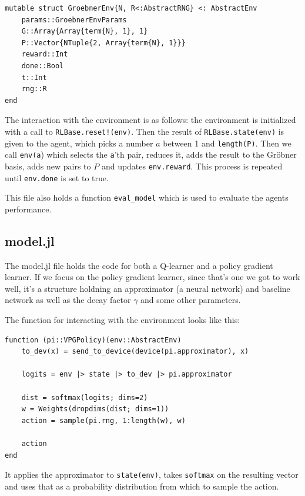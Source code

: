 \documentclass{article}
\theoremstyle{changedot}
\theoremstyle{changedotbreak}
\theoremstyle{nonumberplain}
\begin{document}
\begin{verbatim}
mutable struct GroebnerEnv{N, R<:AbstractRNG} <: AbstractEnv
    params::GroebnerEnvParams
    G::Array{Array{term{N}, 1}, 1}
    P::Vector{NTuple{2, Array{term{N}, 1}}}
    reward::Int
    done::Bool
    t::Int
    rng::R
end
\end{verbatim}

The interaction with the environment is as follows: the environment is initialized with a call to \texttt{RLBase.reset!(env)}. Then the result of \texttt{RLBase.state(env)} is given to the agent, which picks a number $a$ between 1 and \texttt{length(P)}. Then we call \texttt{env(a}) which selects the \texttt{a}'th pair, reduces it, adds the result to the Gröbner basis, adds new pairs to $P$ and updates \texttt{env.reward}. This process is repeated until \texttt{env.done} is set to true.

This file also holds a function \texttt{eval_model} which is used to evaluate the agents performance.

\subsection{model.jl}
The model.jl file holds the code for both a Q-learner and a policy gradient learner. If we focus on the policy gradient learner, since that's one we got to work well, it's a structure holdning an approximator (a neural network) and baseline network as well as the decay factor $\gamma$ and some other parameters.

The function for interacting with the environment looks like this:

\begin{verbatim}
function (pi::VPGPolicy)(env::AbstractEnv)
    to_dev(x) = send_to_device(device(pi.approximator), x)

    logits = env |> state |> to_dev |> pi.approximator

    dist = softmax(logits; dims=2)
    w = Weights(dropdims(dist; dims=1))
    action = sample(pi.rng, 1:length(w), w)

    action
end
\end{verbatim}

It applies the approximator to \texttt{state(env)}, takes \texttt{softmax} on the resulting vector and uses that as a probability distribution from which to sample the action.
\end{document}
